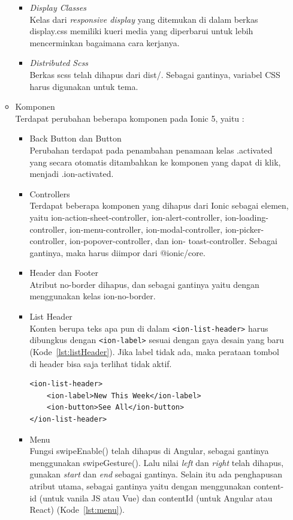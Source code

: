 \begin{enumerate}
\begin{itemize}
\begin{itemize}
			\item {\it Display Classes} \\ 
			Kelas dari {\it responsive display} yang ditemukan di dalam berkas display.css memiliki kueri media yang diperbarui untuk lebih mencerminkan bagaimana cara kerjanya.

			\item {\it Distributed Scss} \\
			Berkas scss telah dihapus dari dist/. Sebagai gantinya, variabel CSS harus digunakan untuk tema.

		\end{itemize}

		\item Komponen\\
		Terdapat perubahan beberapa komponen pada Ionic 5, yaitu :
		\begin{itemize}
			\item Back Button dan Button  \\
			Perubahan terdapat pada penambahan penamaan kelas .activated yang secara otomatis ditambahkan ke komponen yang dapat di klik, menjadi .ion-activated.
			
			\item Controllers\\
			Terdapat beberapa komponen yang dihapus dari Ionic sebagai elemen, yaitu ion-action-sheet-controller, ion-alert-controller, ion-loading-controller, ion-menu-controller, ion-modal-controller, ion-picker-controller, ion-popover-controller, dan ion- toast-controller. Sebagai gantinya, maka harus diimpor dari @ionic/core. 
			\item Header dan Footer\\
			Atribut no-border dihapus, dan sebagai gantinya yaitu dengan menggunakan kelas ion-no-border.
			
			
			\item List Header\\
			Konten berupa teks apa pun di dalam \texttt{<ion-list-header>} harus dibungkus dengan \texttt{<ion-label>} sesuai dengan gaya desain yang baru (Kode~\ref{lst:listHeader}). Jika label tidak ada, maka perataan tombol di header bisa saja terlihat tidak aktif. 
			\begin{lstlisting}[label={lst:listHeader}, caption=Kode Program untuk List Header]
<ion-list-header>
	<ion-label>New This Week</ion-label>
	<ion-button>See All</ion-button>
</ion-list-header>
			\end{lstlisting}
			\item Menu\\
			Fungsi swipeEnable() telah dihapus di Angular, sebagai gantinya menggunakan swipeGesture(). Lalu nilai {\it left} dan {\it right} telah dihapus, gunakan {\it start} dan {\it end} sebagai gantinya. Selain itu ada penghapusan atribut utama, sebagai gantinya yaitu dengan menggunakan content-id (untuk vanila JS atau Vue) dan contentId (untuk Angular atau React) (Kode~\ref{lst:menu}).			
			

\end{itemize}
\end{itemize}
\end{enumerate}
